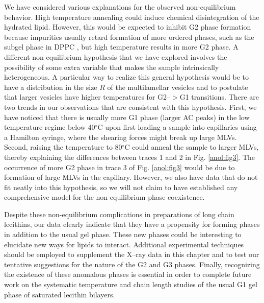 We have considered various explanations for the observed non-equilibrium
behavior.  High temperature annealing could induce chemical 
disintegration of the hydrated lipid.  However, this would be expected to inhibit
G2 phase formation because impurities usually retard formation of more ordered
phases, such as the subgel phase in DPPC \cite{STN94}, but high
temperature results in more G2 phase.
A different non-equilibrium hypothesis that we have explored involves
the possibility of some extra variable that makes the sample 
intrinsically heterogeneous.  A particular way to realize this
general hypothesis would be to have a distribution in the size $R$ of
the multilamellar vesicles and to postulate that larger vesicles have higher 
temperatures for G2--$>$G1 transitions.  There are two trends in our
observations that are consistent with this hypothesis.
First, we have noticed that there is usually more G1 phase (larger AC peaks) 
in the low temperature regime below 40$^{\circ}$C
upon first loading a sample into capillaries using a Hamilton syringe, where 
the shearing forces might break up large MLVs.  Second, raising the
temperature to 80$^{\circ}$C could anneal the sample to larger MLVs,
thereby explaining the differences between traces 1 and 2 in Fig. \ref{anol:fig3}.
The occurrence of more G2 phase in trace 3 of Fig. \ref{anol:fig3} would be due
to formation of large MLVs in the capillary.
However, we also have data that do not fit neatly into this hypothesis,
so we will not claim to have established any comprehensive model for the 
non-equilibrium phase coexistence.  

Despite these non-equilibrium complications in preparations of
long chain lecithins, our data clearly indicate that they have a propensity
for forming phases in addition to the usual gel phase.  These new
phases could be interesting to elucidate new ways for lipids to
interact.  Additional experimental techniques should be employed to supplement the
X--ray data in this chapter and to test our tentative suggestions for the
nature of the G2 and G3 phases.  Finally, recognizing the existence of these
anomalous phases is essential in order to complete future work on the
systematic temperature and chain length studies of the usual G1 gel phase of 
saturated lecithin bilayers.
